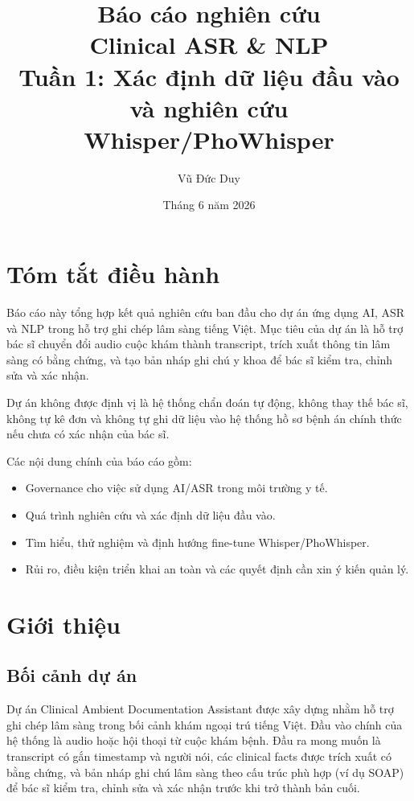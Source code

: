 \documentclass[12pt,a4paper]{article}
\title{\textbf{Báo cáo nghiên cứu}\\[0.3em]
\Large Clinical ASR \& NLP\\[0.3em]
\large Tuần 1: Xác định dữ liệu đầu vào và nghiên cứu Whisper/PhoWhisper}
\author{Vũ Đức Duy}
\date{Tháng 6 năm 2026}
\begin{document}
\maketitle

\tableofcontents
\newpage

\section{Tóm tắt điều hành}

Báo cáo này tổng hợp kết quả nghiên cứu ban đầu cho dự án ứng dụng AI, ASR và NLP trong hỗ trợ ghi chép lâm sàng tiếng Việt. 
Mục tiêu của dự án là hỗ trợ bác sĩ chuyển đổi audio cuộc khám thành transcript, trích xuất thông tin lâm sàng có bằng chứng, và tạo bản nháp ghi chú y khoa để bác sĩ kiểm tra, chỉnh sửa và xác nhận.

Dự án không được định vị là hệ thống chẩn đoán tự động, không thay thế bác sĩ, không tự kê đơn và không tự ghi dữ liệu vào hệ thống hồ sơ bệnh án chính thức nếu chưa có xác nhận của bác sĩ.

Các nội dung chính của báo cáo gồm:
\begin{itemize}
    \item Governance cho việc sử dụng AI/ASR trong môi trường y tế.
    \item Quá trình nghiên cứu và xác định dữ liệu đầu vào.
    \item Tìm hiểu, thử nghiệm và định hướng fine-tune Whisper/PhoWhisper.
    \item Rủi ro, điều kiện triển khai an toàn và các quyết định cần xin ý kiến quản lý.
\end{itemize}

\section{Giới thiệu}

\subsection{Bối cảnh dự án}

Dự án Clinical Ambient Documentation Assistant được xây dựng nhằm hỗ trợ ghi chép lâm sàng trong bối cảnh khám ngoại trú tiếng Việt. Đầu vào chính của hệ thống là audio hoặc hội thoại từ cuộc khám bệnh. Đầu ra mong muốn là transcript có gắn timestamp và người nói, các clinical facts được trích xuất có bằng chứng, và bản nháp ghi chú lâm sàng theo cấu trúc phù hợp (ví dụ SOAP) để bác sĩ kiểm tra, chỉnh sửa và xác nhận trước khi trở thành bản cuối.
\end{document}
